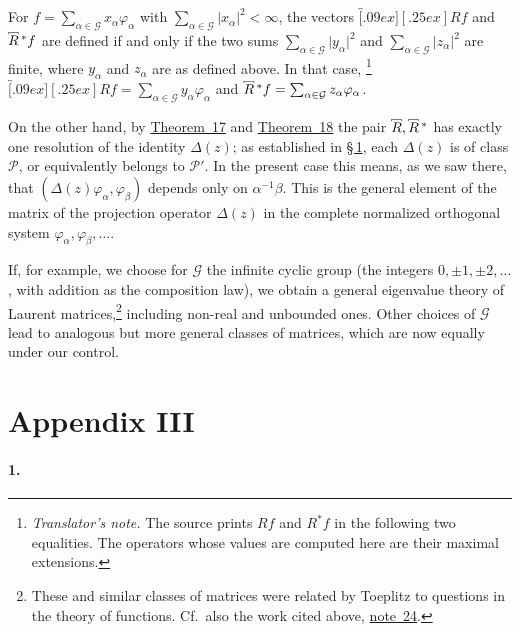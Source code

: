 \documentclass[
  paper=b5,
  twoside=true,
  fontsize=13pt,
  headings=normal,
  bookmarkpackage=false
]{scrartcl}
\theoremstyle{definition}
\newcommand{\NoteRef}[1]{\hyperref[fn:#1]{note~#1}}
\newcommand{\TheoremRef}[1]{\hyperref[thm:#1]{Theorem~#1}}
\newcommand{\MaximalExtension}[1]{\overbracket[.09ex][.25ex]{#1}}
\newcommand{\AdjointMaximalExtension}[1]{\MaximalExtension{#1}\vphantom{#1}^{*}}
\newcounter{translatornote}
\newcounter{savedfootnote}
\newcommand{\TranslatorNote}[1]{%
  \stepcounter{translatornote}%
  \setcounter{savedfootnote}{\value{footnote}}%
  \begingroup
    \renewcommand{\thefootnote}{T\arabic{translatornote}}%
    \footnote{\textit{Translator's note.} #1}%
  \endgroup
  \setcounter{footnote}{\value{savedfootnote}}}
\begin{document}
For \(f=\sum_{\alpha\in \mathcal G}x_{\alpha}\varphi_{\alpha}\) with
\(\sum_{\alpha\in \mathcal G}\lvert x_{\alpha}\rvert^{2}<\infty\), the vectors
\(\MaximalExtension{R}f\) and \(\AdjointMaximalExtension{R}f\) are defined if and only if the
two sums \(\sum_{\alpha\in \mathcal G}\lvert y_{\alpha}\rvert^{2}\) and
\(\sum_{\alpha\in \mathcal G}\lvert z_{\alpha}\rvert^{2}\) are finite, where \(y_{\alpha}\)
and \(z_{\alpha}\) are as defined above. In that case,\TranslatorNote{The
source prints \(Rf\) and \(R^{*}f\) in the following two equalities.
The operators whose values are computed here are their maximal
extensions.} \(\MaximalExtension{R}f=\sum_{\alpha\in \mathcal G}y_{\alpha}\varphi_{\alpha}\)
and \(\AdjointMaximalExtension{R}f=\sum_{\alpha\in \mathcal G}z_{\alpha}\varphi_{\alpha}\).

On the other hand, by \TheoremRef{17} and \TheoremRef{18} the pair
\(\MaximalExtension{R},\AdjointMaximalExtension{R}\) has exactly one resolution of the
identity \(\Delta(z)\); as established in \hyperref[app:II-1]{\S\,1}, each \(\Delta(z)\)
is of class \(\mathcal P\), or equivalently belongs to \(\mathcal P'\).
In the present case this means, as we saw there, that
\((\Delta(z)\varphi_{\alpha},\varphi_{\beta})\) depends only on \(\alpha^{-1}\beta\).  This is the general element of the
matrix of the projection operator \(\Delta(z)\) in the complete
normalized orthogonal system
\(\varphi_{\alpha},\varphi_{\beta},\ldots\).

If, for example, we choose for \(\mathcal G\) the infinite cyclic group (the
integers \(0,\pm1,\pm2,\ldots\), with addition as the composition law),
we obtain a general eigenvalue theory of Laurent matrices,\footnote{\label{fn:71}These
and similar classes of matrices were related by Toeplitz to questions in
the theory of functions.  Cf.\ also the work cited above, \NoteRef{24}.}
including non-real and unbounded ones.  Other choices of \(\mathcal G\) lead to
analogous but more general classes of matrices, which are now equally
under our control.

\section*{Appendix III}
\label{app:commutativity-unbounded}

\paragraph*{1.}
\label{app:III-1}
\end{document}
